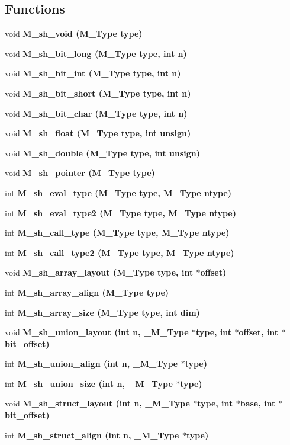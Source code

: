 \subsection*{Functions}
\begin{CompactItemize}
\item 
void \bf{M\_\-sh\_\-void} (\bf{M\_\-Type} type)
\item 
void \bf{M\_\-sh\_\-bit\_\-long} (\bf{M\_\-Type} type, int n)
\item 
void \bf{M\_\-sh\_\-bit\_\-int} (\bf{M\_\-Type} type, int n)
\item 
void \bf{M\_\-sh\_\-bit\_\-short} (\bf{M\_\-Type} type, int n)
\item 
void \bf{M\_\-sh\_\-bit\_\-char} (\bf{M\_\-Type} type, int n)
\item 
void \bf{M\_\-sh\_\-float} (\bf{M\_\-Type} type, int unsign)
\item 
void \bf{M\_\-sh\_\-double} (\bf{M\_\-Type} type, int unsign)
\item 
void \bf{M\_\-sh\_\-pointer} (\bf{M\_\-Type} type)
\item 
int \bf{M\_\-sh\_\-eval\_\-type} (\bf{M\_\-Type} type, \bf{M\_\-Type} ntype)
\item 
int \bf{M\_\-sh\_\-eval\_\-type2} (\bf{M\_\-Type} type, \bf{M\_\-Type} ntype)
\item 
int \bf{M\_\-sh\_\-call\_\-type} (\bf{M\_\-Type} type, \bf{M\_\-Type} ntype)
\item 
int \bf{M\_\-sh\_\-call\_\-type2} (\bf{M\_\-Type} type, \bf{M\_\-Type} ntype)
\item 
void \bf{M\_\-sh\_\-array\_\-layout} (\bf{M\_\-Type} type, int $\ast$offset)
\item 
int \bf{M\_\-sh\_\-array\_\-align} (\bf{M\_\-Type} type)
\item 
int \bf{M\_\-sh\_\-array\_\-size} (\bf{M\_\-Type} type, int dim)
\item 
void \bf{M\_\-sh\_\-union\_\-layout} (int n, \bf{\_\-M\_\-Type} $\ast$type, int $\ast$offset, int $\ast$bit\_\-offset)
\item 
int \bf{M\_\-sh\_\-union\_\-align} (int n, \bf{\_\-M\_\-Type} $\ast$type)
\item 
int \bf{M\_\-sh\_\-union\_\-size} (int n, \bf{\_\-M\_\-Type} $\ast$type)
\item 
void \bf{M\_\-sh\_\-struct\_\-layout} (int n, \bf{\_\-M\_\-Type} $\ast$type, int $\ast$base, int $\ast$bit\_\-offset)
\item 
int \bf{M\_\-sh\_\-struct\_\-align} (int n, \bf{\_\-M\_\-Type} $\ast$type)

\end{CompactItemize}
